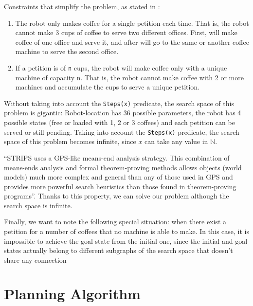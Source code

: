 \documentclass[12pt,a4paper,oneside]{article}
\numberwithin{equation}{section}
\numberwithin{equation}{section}
\theoremstyle{definition}
\begin{document}
Constraints that simplify the problem, as stated in \cite{problemdefinition}:
\begin{enumerate}
	\item The robot only makes coffee for a single petition each time. That is, the robot cannot make 3 cups of coffee to serve two different offices. First, will make coffee of one office and serve it, and after will go to the same or another coffee machine to serve the second office.
	\item If a petition is of \texttt{n} cups, the robot will make coffee only with a unique machine of capacity n. That is, the robot cannot make coffee with 2 or more machines and accumulate the cups to serve a unique petition.
\end{enumerate}


Without taking into account the \texttt{Steps(x)} predicate, the search space of this problem is gigantic: Robot-location has 36 possible parameters, the robot has 4 possible states (free or loaded with 1, 2 or 3 coffees) and each petition can be served or still pending. Taking into account the \texttt{Steps(x)} predicate, the search space of this problem becomes infinite, since $x$ can take any value in $\mathbb{N}$.


“STRIPS uses a GPS-like means-end analysis strategy\cite{gps}. This combination of means-ends analysis and formal theorem-proving methods allows objects (world models) much more complex and general than any of those used in GPS and provides more powerful search heuristics than those found in theorem-proving programs”\cite{strips}. Thanks to this property, we can solve our problem although the search space is infinite.

Finally, we want to note the following special situation: when there exist a petition for a number of coffees that no machine is able to make. In this case, it is impossible to achieve the goal state from the initial one, since the initial and goal states actually belong to different subgraphs of the search space that doesn’t share any connection 


\newpage

\section{Planning Algorithm} \label{Planning Algorithm}
\end{document}
